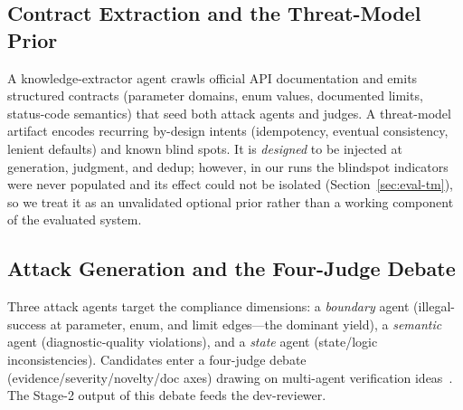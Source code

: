 \documentclass[sigconf]{acmart}
\begin{document}
\subsection{Contract Extraction and the Threat-Model Prior}\label{sec:tm}
A knowledge-extractor agent crawls official API documentation and emits structured contracts (parameter domains, enum values, documented limits, status-code semantics) that seed both attack agents and judges. A threat-model artifact encodes recurring by-design intents (idempotency, eventual consistency, lenient defaults) and known blind spots. It is \emph{designed} to be injected at generation, judgment, and dedup; however, in our runs the blindspot indicators were never populated and its effect could not be isolated (Section~\ref{sec:eval-tm}), so we treat it as an unvalidated optional prior rather than a working component of the evaluated system.

\subsection{Attack Generation and the Four-Judge Debate}
Three attack agents target the compliance dimensions: a \emph{boundary} agent (illegal-success at parameter, enum, and limit edges---the dominant yield), a \emph{semantic} agent (diagnostic-quality violations), and a \emph{state} agent (state/logic inconsistencies). Candidates enter a four-judge debate (evidence/severity/novelty/doc axes) drawing on multi-agent verification ideas~\cite{du2023improving}. The Stage-2 output of this debate feeds the dev-reviewer.
\end{document}
